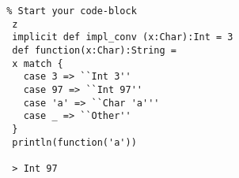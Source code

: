\documentclass{standalone}
\begin{document}
\lstset{language=Scala}          

\begin{lstlisting} % Start your code-block
  z
  implicit def impl_conv (x:Char):Int = 3
  def function(x:Char):String =
  x match {
    case 3 => ``Int 3''
    case 97 => ``Int 97''
    case 'a' => ``Char 'a'''
    case _ => ``Other''
  }
  println(function('a'))

  > Int 97
\end{lstlisting}
\end{document}
